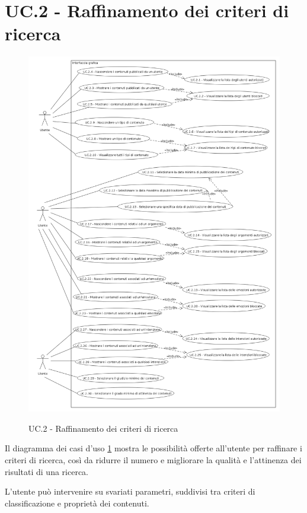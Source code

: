 \documentclass[10pt,a4paper,headinclude,footinclude,hidelinks]{scrreprt} %
\begin{document}
	\section{UC.2 - Raffinamento dei criteri di ricerca}
	\label{ch:stage:ar:uc:2}

	\begin{figure}[]
		\begin{center}
	    	\includegraphics[width=12cm]{uc_2.png}
			\label{gfx:uc:2}
			\caption{UC.2 - Raffinamento dei criteri di ricerca}
		\end{center}
	\end{figure}

	Il diagramma dei casi d'uso \ref{gfx:uc:2} mostra le possibilità offerte all'utente per raffinare i criteri di ricerca, così da ridurre il numero e migliorare la qualità e l'attinenza dei risultati di una ricerca.

	L'utente può intervenire su svariati parametri, suddivisi tra criteri di classificazione e proprietà dei contenuti.
\end{document}
